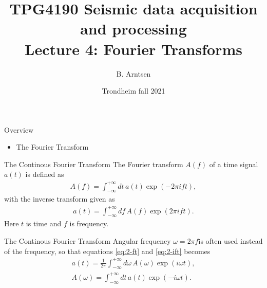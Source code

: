 \documentclass[xcolor=dvipsnames,notes]{beamer}
\begin{document}
\title{TPG4190 Seismic data acquisition and processing \\
               Lecture 4: Fourier Transforms}
\author{B. Arntsen}
\date{Trondheim fall 2021}
\begin{frame}
 \titlepage
\end{frame}
\begin{frame}{Overview}
\begin{itemize}
  \item The Fourier Transform
  \end{itemize}
\end{frame}
\begin{frame}{The Continous Fourier Transform}
The Fourier transform $A(f)$ of a time signal $a(t)$ is defined as
%
\begin{eqnarray}
 A(f) = \int^{+\infty}_{-\infty} dt\, a(t) \exp(-2\pi i f t) \label{eq:2-ft},
\end{eqnarray}
%
with the inverse transform given as
%
\begin{eqnarray}
 a(t) = \int^{+\infty}_{-\infty} df\, A(f) \exp(2\pi i f t) \label{eq:2-ift}.
\end{eqnarray}
%
Here $t$ is time and $f$ is frequency.
\end{frame}
\begin{frame}{The Continous Fourier Transform}
Angular frequency $\omega=2\pi f$is often used instead
of the frequency, so that equations \eqref{eq:2-ft} and \eqref{eq:2-ift} becomes
%
\begin{eqnarray}
 a(t) = \frac{1}{2\pi}\int^{+\infty}_{-\infty} d\omega\, A(\omega) \exp(i\omega t),\label{eq:2-ftb}\\
 A(\omega) = \int^{+\infty}_{-\infty} dt\, a(t) \exp(-i\omega t) \label{eq:2-iftb}.
\end{eqnarray}
%
\end{frame}
\end{document}

